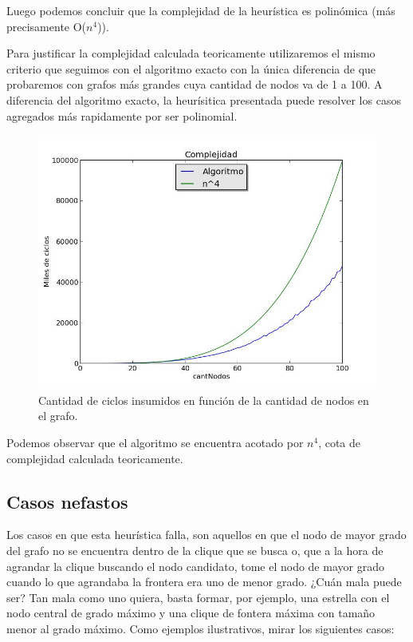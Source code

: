 Luego podemos concluir que la complejidad de la heurística es polinómica (más precisamente O($n^{4}$)). 

Para justificar la complejidad calculada teoricamente utilizaremos el mismo criterio que seguimos con el algoritmo exacto con la única diferencia de que probaremos con grafos más grandes cuya cantidad de nodos va de 1 a 100. A diferencia del algoritmo exacto, la heurísitica presentada puede resolver los casos agregados más rapidamente por ser polinomial.

\begin{figure}[H]
\centering\includegraphics[width=11 cm]{goloso/grafico.jpg}
\caption{Cantidad de ciclos insumidos en función de la cantidad de nodos en el grafo.}
\end{figure}

Podemos observar que el algoritmo se encuentra acotado por $n^4$, cota de complejidad calculada teoricamente.


\subsection{Casos nefastos}

Los casos en que esta heurística falla, son aquellos en que el nodo de mayor grado del grafo no se encuentra dentro de la clique que se busca o, que a la hora de agrandar la clique buscando el nodo candidato, tome el nodo de mayor grado cuando lo que agrandaba la frontera era uno de menor grado. 
¿Cuán mala puede ser? Tan mala como uno quiera, basta formar, por ejemplo, una estrella con el nodo central de grado máximo y una clique de fontera máxima con tamaño menor al grado máximo. Como ejemplos ilustrativos, mirar los siguientes casos:

